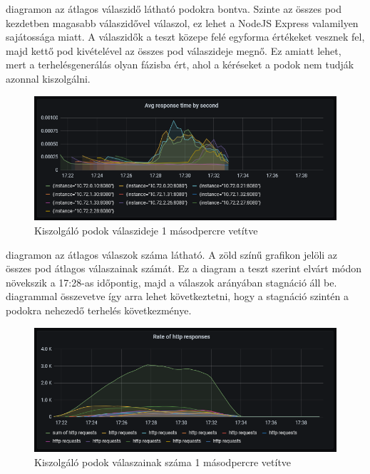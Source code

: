 \documentclass[a4paper,oneside]{article}
\begin{document}
 diagramon az átlagos válaszidő látható podokra bontva.  Szinte az
összes pod kezdetben magasabb válaszidővel válaszol, ez lehet a NodeJS
Express valamilyen sajátossága miatt.  A válaszidők a teszt közepe felé egyforma
értékeket vesznek fel, majd kettő pod kivételével az összes pod válaszideje
megnő.  Ez amiatt lehet, mert a terhelésgenerálás olyan fázisba ért, ahol a
kéréseket a podok nem tudják azonnal kiszolgálni.

\begin{figure}[H]
  \centering
  \includegraphics[width=\textwidth]{light_cpu_response_time.PNG}
  \caption{Kiszolgáló podok válaszideje 1 másodpercre vetítve}
  \label{light_cpu_response_time}  
\end{figure}

 diagramon az átlagos válaszok száma látható.
A zöld színű grafikon jelöli az összes pod átlagos válaszainak számát.  Ez a
diagram a teszt szerint elvárt módon növekszik a 17:28-as időpontig, majd a
válaszok arányában stagnáció áll be.  
diagrammal összevetve így arra lehet következtetni, hogy a stagnáció szintén
a podokra nehezedő terhelés következménye.

\begin{figure}[H]
  \centering
  \includegraphics[width=\textwidth]{light_cpu_response_count.PNG}
  \caption{Kiszolgáló podok válaszainak száma 1 másodpercre vetítve}
  \label{light_cpu_response_count}  
\end{figure}
\end{document}

